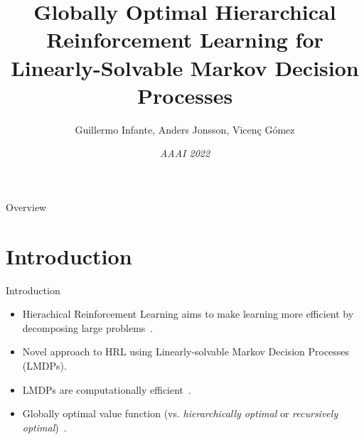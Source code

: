 \documentclass{beamer}
\title[Globally Optimal HRL for LMDPs]{Globally Optimal Hierarchical Reinforcement Learning for Linearly-Solvable Markov Decision Processes}
\author[G. Infante, A. Jonsson, V. Gómez ]{Guillermo Infante, Anders Jonsson, Vicenç Gómez}
\date[]{\textit{AAAI 2022}}
\theoremstyle{mystyle}
\begin{document}
\begin{frame}
   \maketitle
\end{frame}

\begin{frame}{Overview}
\tableofcontents
\end{frame}

\section{Introduction}

\begin{frame}{Introduction}

\begin{itemize}
    \item Hierachical Reinforcement Learning aims to make {\color{blue} learning more efficient} by decomposing large problems~\citep{conf/nips/Wen20}.
    \item Novel approach to HRL using Linearly-solvable Markov Decision Processes (LMDPs).
    \item LMDPs are {\color{blue} computationally efficient}~\citep{TodorovNIPS2007}.
    \item {\color{blue}Globally optimal value function} (vs. \textit{hierarchically optimal} or \textit{recursively optimal})~\citep{dietterich2000hierarchical}. 
\end{itemize}
    
\end{frame}
\end{document}
